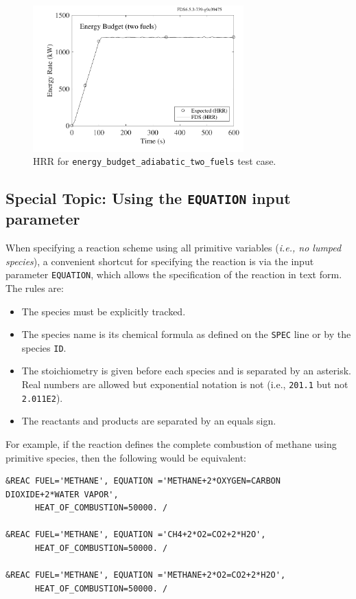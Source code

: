 \documentclass[11pt]{book}
\newcommand{\ct}{\tt\small}
\begin{document}
\begin{figure}[ht]
\centering
\includegraphics[width=3.2in]{SCRIPT_FIGURES/energy_budget_adiabatic_two_fuels}
\caption[HRR for {\ct energy\_budget\_adiabatic\_two\_fuels} test case]{HRR for {\ct energy\_budget\_adiabatic\_two\_fuels} test case.}
\label{fig:hrr_two_fuels}
\end{figure}


\subsection{Special Topic: Using the {\ct EQUATION} input parameter}
\label{info:EQUATION}

When specifying a reaction scheme using all primitive variables ({\em i.e., no lumped species}), a convenient shortcut for specifying the reaction is via the input parameter {\ct EQUATION}, which allows the specification of the reaction in text form.  The rules are:

\begin{itemize}
\item The species must be explicitly tracked.
\item The species name is its chemical formula as defined on the {\ct SPEC} line or by the species {\ct ID}.
\item The stoichiometry is given before each species and is separated by an asterisk. Real numbers are allowed but exponential notation is not (i.e., {\ct 201.1} but not {\ct 2.011E2}).
\item The reactants and products are separated by an equals sign.
\end{itemize}

\noindent For example, if the reaction defines the complete combustion of methane using primitive species, then the following would be equivalent:

\footnotesize
\begin{verbatim}
&REAC FUEL='METHANE', EQUATION ='METHANE+2*OXYGEN=CARBON DIOXIDE+2*WATER VAPOR',
      HEAT_OF_COMBUSTION=50000. /

&REAC FUEL='METHANE', EQUATION ='CH4+2*O2=CO2+2*H2O',
      HEAT_OF_COMBUSTION=50000. /

&REAC FUEL='METHANE', EQUATION ='METHANE+2*O2=CO2+2*H2O',
      HEAT_OF_COMBUSTION=50000. /
\end{verbatim} \normalsize
\end{document}
